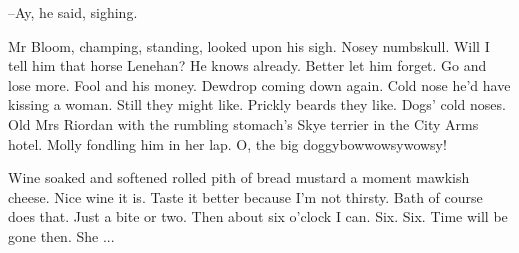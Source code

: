 --Ay,
he said, sighing.

Mr Bloom,
champing, standing,
looked upon his sigh.
Nosey numbskull.
Will I tell him that horse Lenehan?
He knows already.
Better let him forget.
Go and lose more.
Fool and his money.
Dewdrop coming down again.
Cold nose he'd have kissing a woman.
Still they might like.
Prickly beards they like.
Dogs' cold noses.
Old Mrs Riordan with the rumbling stomach's Skye terrier in the City Arms hotel.
Molly fondling him in her lap.
O, the big doggybowwowsywowsy!

Wine soaked and softened rolled pith of bread
mustard a moment
mawkish cheese.
Nice wine it is.
Taste it better because I'm not thirsty.
Bath of course does that.
Just a bite or two.
Then about six o'clock I can.
Six.
Six.
Time will be gone then.
She ...

